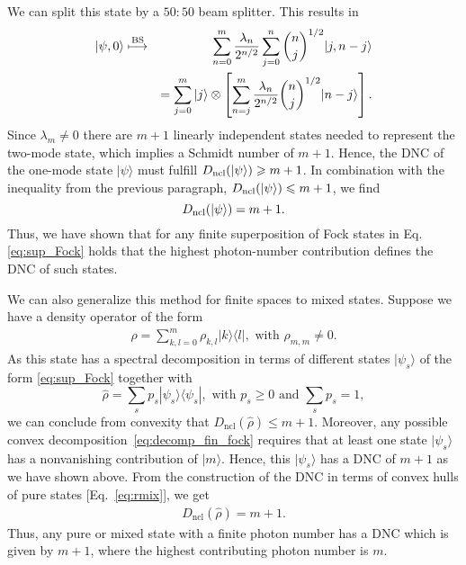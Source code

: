 \documentclass[aps,pra,twocolumn,showpacs,superscriptaddress,10pt]{revtex4-1}
\begin{document}
	We can split this state by a $50{:}50$ beam splitter.
	This results in
	\begin{eqnarray}
		|\psi,0\rangle
		&\stackrel{{\rm BS}}{\longmapsto}&
		\sum\limits_{n=0}^{m}\frac{\lambda_n}{2^{n/2}}\sum\limits_{j=0}^{n}\binom{n}{j}^{1/2}|j,n-j\rangle
		\\\nonumber &&=
		\sum\limits_{j=0}^{m}|j\rangle\otimes\left[\sum\limits_{n=j}^{m}\frac{\lambda_n}{2^{n/2}}\binom{n}{j}^{1/2}|n-j\rangle\right].
	\end{eqnarray}
	Since $\lambda_m\neq0$ there are $m+1$ linearly independent states needed to represent the two-mode state, which implies a Schmidt number of $m+1$.
	Hence, the DNC of the one-mode state $|\psi\rangle$ must fulfill $D_{\rm ncl}(|\psi\rangle)\geqslant m+1$.
	In combination with the inequality from the previous paragraph, $D_{\rm ncl}(|\psi\rangle)\leqslant m+1$, we find
	\begin{equation}
		D_{\rm ncl}(|\psi\rangle)=m+1.
	\end{equation}
	Thus, we have shown that for any finite superposition of Fock states in Eq. \eqref{eq:sup_Fock} holds that the highest photon-number contribution defines the DNC of such states.
	
	We can also generalize this method for finite spaces to mixed states.
	Suppose we have a density operator of the form
	\begin{align}\label{eq:mixFock}
		\hat\rho=\sum_{k,l=0}^m \rho_{k,l} |k\rangle\langle l|, \text{ with }\rho_{m,m}\neq0.
	\end{align}
	As this state has a spectral decomposition in terms of different states $|\psi_s\rangle$ of the form \eqref{eq:sup_Fock} together with
	\begin{equation}
		\hat{\rho}=\sum_{s} p_s|\psi_s\rangle\langle\psi_s|,
		\text{ with } p_s\geqslant 0
		\text{ and } \sum_{s}p_s=1, \label{eq:decomp_fin_fock}
	\end{equation}
	we can conclude from convexity that \mbox{$D_\mathrm{ncl}(\hat\rho)\leqslant m+1$.}
	Moreover, any possible convex decomposition~\eqref{eq:decomp_fin_fock} requires that at least one state $|\psi_s\rangle$ has a nonvanishing contribution of $|m\rangle$.
	Hence, this $|\psi_s\rangle$ has a DNC of $m+1$ as we have shown above.
	From the construction of the DNC in terms of convex hulls of pure states [Eq.~\eqref{eq:rmix}], we get
	\begin{align}
		D_\mathrm{ncl}(\hat\rho)=m+1.
	\end{align}
	Thus, any pure or mixed state with a finite photon number has a DNC which is given by $m+1$, where the highest contributing photon number is $m$.
\end{document}
